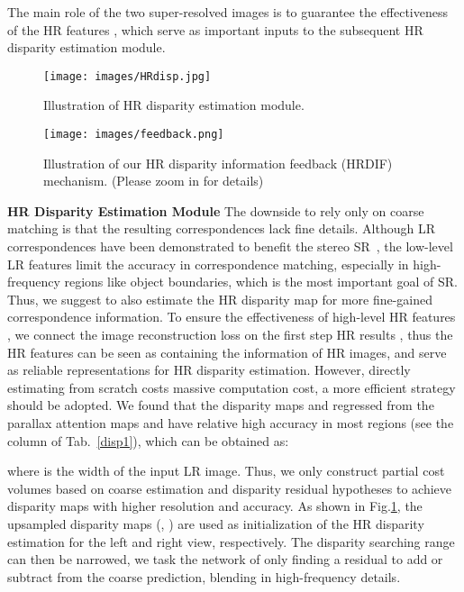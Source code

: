 \documentclass[sigconf]{acmart}
\begin{document}
The main role of the two super-resolved images is to guarantee the effectiveness of the HR features , which serve as important inputs to the subsequent HR disparity estimation module.

\begin{figure}
  \centering
  \texttt{[image: images/HRdisp.jpg]}
  \begin{minipage}[c]{1\textwidth}
  \end{minipage}
  \caption{Illustration of HR disparity estimation module.}
  \label{fig-5}
  \vspace{-8pt}
\end{figure}

\begin{figure*}[t]
  \centering
  \texttt{[image: images/feedback.png]}
  \begin{minipage}[c]{1\textwidth}
  \end{minipage}
  \caption{Illustration of our HR disparity information feedback (HRDIF) mechanism. (Please zoom in for details)}
  \label{fig-4}
  \vspace{-8pt}
\end{figure*}


\textbf{HR Disparity Estimation Module}
The downside to rely only on coarse matching is that the resulting correspondences lack fine details. Although LR correspondences have been demonstrated to benefit the stereo SR~\cite{Wang2019LearningPA, Song2020StereoscopicIS}, the low-level LR features limit the accuracy in correspondence matching, especially in high-frequency regions like object boundaries, which is the most important goal of SR. Thus, we suggest to also estimate the HR disparity map for more fine-gained correspondence information. To ensure the effectiveness of high-level HR features , we connect the image reconstruction loss on the first step HR results , thus the HR features  can be seen as containing the information of HR images, and serve as reliable representations for HR disparity estimation. However, directly estimating from scratch costs massive computation cost, a more efficient strategy should be adopted. We found that the disparity maps  and  regressed from the parallax attention maps  and  have relative high accuracy in most regions (see the  column of Tab.~\ref{disp1}), which can be obtained as:

where  is the width of the input LR image. Thus, we only construct partial cost volumes  based on coarse estimation and disparity residual hypotheses to achieve disparity maps with higher resolution and accuracy. As shown in Fig.\ref{fig-5}, the upsampled disparity maps (, ) are used as initialization of the HR disparity estimation for the left and right view, respectively. The disparity searching range can then be narrowed, we task the network of only finding a residual to add or subtract from the coarse prediction, blending in high-frequency details.
\end{document}
